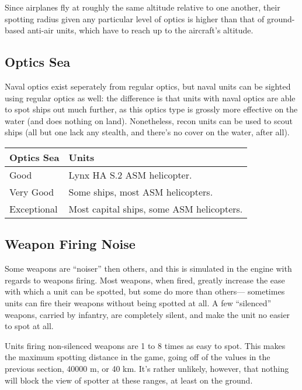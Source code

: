 \documentclass{article}
\begin{document}
Since airplanes fly at roughly the same altitude relative to one another, their
spotting radius given any particular level of optics is higher than that of
ground-based anti-air units, which have to reach up to the aircraft's altitude.

\subsection{Optics Sea}

Naval optics exist seperately from regular optics, but naval units can be
sighted using regular optics as well: the difference is that units with naval
optics are able to spot ships out much further, as this optics
type is grossly more effective on the water (and does nothing on land).
Nonetheless, recon units can be used to scout ships (all but one lack any
stealth, and there's no cover on the water, after all).

\begin{center}
    \begin{tabular}{ | l | l | }
    \hline
    Optics Sea & Units \\ \hline
    Good & Lynx HA S.2 ASM helicopter.\\
    Very Good & Some ships, most ASM helicopters.\\
    Exceptional & Most capital ships, some ASM helicopters.\\
    \hline
    \end{tabular}
\end{center}

\subsection{Weapon Firing Noise}

Some weapons are ``noiser'' then others, and this is simulated in the engine
with regards to weapons firing. Most weapons, when fired, greatly increase the
ease with which a unit can be spotted, but some do more than others---
sometimes units can fire their weapons without being spotted at all. A few
``silenced'' weapons, carried by infantry, are completely silent, and make the
unit no easier to spot at all.

Units firing non-silenced weapons are 1 to 8 times as easy to spot. This makes
the maximum spotting distance in the game, going off of the values in the previous
section, 40000 m, or 40 km. It's rather unlikely, however, that nothing will
block the view of spotter at these ranges, at least on the ground.
\end{document}
